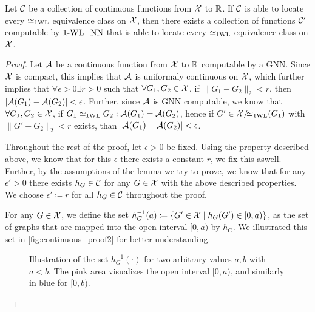 \begin{lemma}\label{lem:continuous_proof2}
    Let $\mathcal{C}$ be a collection of continuous functions from $\mathcal{X}$ to $\mathbb{R}$. If $\mathcal{C}$ is able to locate every $\simeq_{\text{1WL}}$ equivalence class on $\mathcal{X}$, then there exists a collection of functions $\mathcal{C}'$ computable by $\text{1-WL+NN}$ that is able to locate every $\simeq_{\text{1WL}}$ equivalence class on $\mathcal{X}$.
\end{lemma}

\begin{proof}
    Let $\mathcal{A}$ be a continuous function from $\mathcal{X}$ to $\mathbb{R}$ computable by a GNN. Since $\mathcal{X}$ is compact, this implies that $\mathcal{A}$ is uniformaly continuous on $\mathcal{X}$, which further implies that $\forall \epsilon > 0 \exists r > 0$ such that $\forall G_1, G_2 \in \mathcal{X}$, if $\| G_1 - G_2 \|_2 < r$, then $|\mathcal{A}(G_1) - \mathcal{A}(G_2)| < \epsilon$. Further, since $\mathcal{A}$ is GNN computable, we know that $\forall G_1, G_2 \in \mathcal{X}$, if $G_1 \simeq_{\text{1WL}} G_2: \mathcal{A}(G_1) = \mathcal{A}(G_2)$, hence if $G' \in \mathcal{X}/\!{\simeq_{\text{1WL}}}(G_1)$ with $\| G' - G_2 \|_2 < r$ exists, than $|\mathcal{A}(G_1) - \mathcal{A}(G_2)| < \epsilon$.\newline

    Throughout the rest of the proof, let $\epsilon > 0$ be fixed. Using the property described above, we know that for this $\epsilon$ there exists a constant $r$, we fix this aswell. Further, by the assumptions of the lemma we try to prove, we know that for any $\epsilon' > 0$ there exists $h_{G} \in \mathcal{C}$ for any $G \in \mathcal{X}$ with the above described properties. We choose $\epsilon' \coloneqq r$ for all $h_{G} \in \mathcal{C}$ throughout the proof.\newline

    For any $G \in \mathcal{X}$, we define the set $h_{G}^{-1}(a) \coloneqq \{ G' \in \mathcal{X} \mid h_G(G') \in [0, a) \}$, as the set of graphs that are mapped into the open interval $[0, a)$ by $h_G$. We illustrated this set in \autoref{fig:continuous_proof2} for better understanding.
    
    \begin{figure}[H]
        \centering
        
        \caption{Illustration of the set $h_{G}^{-1}(\cdot)$ for two arbitrary values $a,b$ with $a < b$. The pink area visualizes the open interval $[0, a)$, and similarly in blue for $[0, b)$.}
        \label{fig:continuous_proof2}
    \end{figure}
    

\end{proof}
